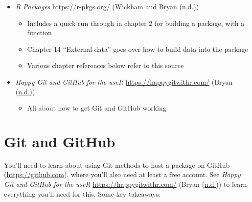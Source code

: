 \documentclass[
]{book}
\providecommand{\tightlist}{%
  \setlength{\itemsep}{0pt}\setlength{\parskip}{0pt}}
\begin{document}
\begin{itemize}
\item
  \emph{R Packages} \url{https://r-pkgs.org/} (Wickham and Bryan (\protect\hyperlink{ref-r-pkgs}{n.d.}))

  \begin{itemize}
  \tightlist
  \item
    Includes a quick run through in chapter 2 for building a package, with a function
  \item
    Chapter 14 ``External data'' goes over how to build data into the package
  \item
    Various chapter references below refer to this source
  \end{itemize}
\item
  \emph{Happy Git and GitHub for the useR} \url{https://happygitwithr.com/} (Bryan (\protect\hyperlink{ref-happygitwithr}{n.d.}))

  \begin{itemize}
  \tightlist
  \item
    All about how to get Git and GitHub working
  \end{itemize}
\end{itemize}

\hypertarget{git-and-github}{%
\section{Git and GitHub}\label{git-and-github}}

You'll need to learn about using Git methods to host a package on GitHub (\url{https://github.com}), where you'll also need at least a free account. See \emph{Happy Git and GitHub for the useR} \url{https://happygitwithr.com/} (Bryan (\protect\hyperlink{ref-happygitwithr}{n.d.})) to learn everything you'll need for this. Some key takeaways:
\end{document}
